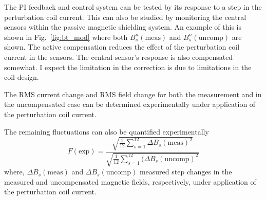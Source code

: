 The PI feedback and control system can be tested by its response to a step in the perturbation coil current. This can also be studied by monitoring the central sensors within the passive magnetic shielding system. An example of this is shown in Fig.~\ref{fig:bt_mod} where both $B_s^n(\text{meas})$ and $B_s^n(\text{uncomp})$ are shown.  The active compensation reduces the effect of the perturbation coil current in the sensors. The central sensor's response is also compensated somewhat. I expect the limitation in the correction is due to limitations in the coil design. 



The RMS current change and RMS field change for both the measurement and in the uncompensated case can be determined experimentally under application of the perturbation coil current.


The remaining fluctuations can also be quantified experimentally
\begin{equation}\label{eq:fluc_exp}
   F(\mathrm{exp})=\frac{\sqrt{\frac{1}{12} \sum_{s=1}^{12} \Delta B_s(\text{meas})^2}}{\sqrt{\frac{1}{12} \sum_{s=1}^{12} (\Delta B_s(\text{uncomp})^2}}
\end{equation}
where, $\Delta B_s(\text{meas})$ and $\Delta B_s(\text{uncomp})$ measured step changes in the measured and uncompensated magnetic fields, respectively, under application of the perturbation coil current.



